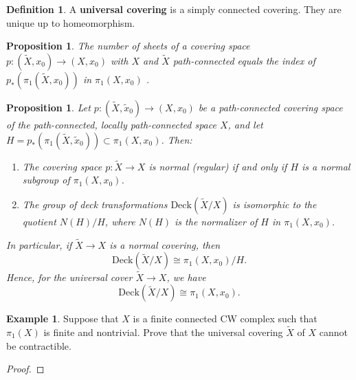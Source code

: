 \documentclass[a4paper]{article}
\theoremstyle{theorem}
\newtheorem{proposition}[theorem]{Proposition}
\theoremstyle{definition}
\newtheorem{definition}{Definition} [section]
\newtheorem{example}{Example}
\theoremstyle{remark}
\theoremstyle{gremark}
\theoremstyle{discussion}
\theoremstyle{notation}
\begin{document}
	
\section*{}

\begin{definition}
	A \textbf{universal covering} is a simply connected covering. They are unique up to homeomorphism.
\end{definition}


\begin{proposition}
	The number of sheets of a covering space $p : ( \widetilde{X}, x_0)\to (X, x_0)$
	with $X$ and $\widetilde{X}$ path-connected equals the index of $p_*(\pi_1(\widetilde{X}, x_0))$ in $\pi_1(X, x_0)$ .
\end{proposition}

\begin{proposition}
	Let $p : (\widetilde{X}, \widetilde{x}_0) \to (X, x_0) $ be a path-connected covering space of the path-connected, locally path-connected space $X$, and let $H = p_* \left( \pi_1(\widetilde{X}, \widetilde{x}_0) \right) \subset \pi_1(X, x_0)$. Then:
	
	\begin{enumerate}
		\item The covering space \( p : \widetilde{X} \to X \) is normal (regular) if and only if \( H \) is a normal subgroup of \( \pi_1(X, x_0) \).
		
		\item The group of deck transformations \( \text{Deck}(\widetilde{X}/X) \) is isomorphic to the quotient \( N(H)/H \), where \( N(H) \) is the normalizer of \( H \) in \( \pi_1(X, x_0) \).
	\end{enumerate}
	
	\noindent In particular, if \( \widetilde{X} \to X \) is a normal covering, then
	\[
	\text{Deck}(\widetilde{X}/X) \cong \pi_1(X, x_0)/H.
	\]
	Hence, for the universal cover \( \widetilde{X} \to X \), we have
	\[
	\text{Deck}(\widetilde{X}/X) \cong \pi_1(X, x_0).
	\]
\end{proposition}

\begin{example}
	Suppose that $X$ is a finite connected CW complex such that $\pi_1(X)$ is finite and nontrivial. Prove that the universal covering $\tilde{X}$ of $X$ cannot be contractible.
\end{example}

\begin{proof}
	
\end{proof}
	
	
\end{document}
